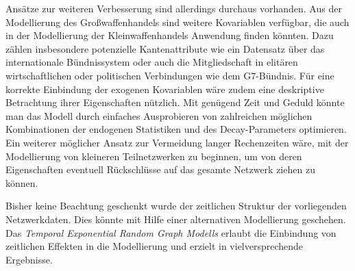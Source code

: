 \documentclass[a4paper,ngerman,oneside,titlepage,bibliography=totoc,11pt]{scrreprt}
\begin{document}
Ansätze zur weiteren Verbesserung sind allerdings durchaus vorhanden. Aus der Modellierung des Großwaffenhandels sind weitere Kovariablen verfügbar, die auch in der Modellierung der Kleinwaffenhandels Anwendung finden könnten. Dazu zählen insbesondere potenzielle Kantenattribute wie ein Datensatz über das internationale Bündnissystem oder auch die Mitgliedschaft in elitären wirtschaftlichen oder politischen Verbindungen wie dem G7-Bündnis.
Für eine korrekte Einbindung der exogenen Kovariablen wäre zudem eine deskriptive Betrachtung ihrer Eigenschaften nützlich.
Mit genügend Zeit und Geduld könnte man das Modell durch einfaches Ausprobieren von zahlreichen möglichen Kombinationen der endogenen Statistiken und des Decay-Parameters optimieren. Ein weiterer möglicher Ansatz zur Vermeidung langer Rechenzeiten wäre, mit der Modellierung von kleineren Teilnetzwerken zu beginnen, um von deren Eigenschaften eventuell Rückschlüsse auf das gesamte Netzwerk ziehen zu können.

Bisher keine Beachtung geschenkt wurde der zeitlichen Struktur der vorliegenden Netzwerkdaten. Dies könnte mit Hilfe einer alternativen Modellierung geschehen. Das \emph{Temporal Exponential Random Graph Modells} erlaubt die Einbindung von zeitlichen Effekten in die Modellierung und erzielt in \citet{armstransfer} vielversprechende Ergebnisse. 



\newpage









\newpage
\listoffigures
\newpage
\listoftables
\end{document}
